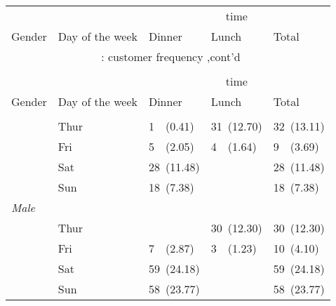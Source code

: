 \documentclass[8pt]{beamer}
\begin{document}
\begin{frame}
\hypertarget{customer frequency}{} 
\begin{longtable}{lllll}
\toprule
&&
\multicolumn{ 3 }{c}{ time } \\
\cmidrule(lr){3-5}
Gender & Day of the week & Dinner & Lunch & Total \\
\hline
\endfirsthead
\multicolumn{5}{c}{\tablename~\thetable{}: customer frequency ,cont'd}\\\\
\toprule
&&
\multicolumn{ 3 }{c}{ time } \\
\cmidrule(lr){3-5}
Gender & Day of the week & Dinner & Lunch & Total \\
\hline
\endhead \hline \endfoot \hline

\endlastfoot
\multicolumn{ 4 }{l}{\textit{ Female }}\\
& Thur & 1~~(0.41) & 31~(12.70) & 32~(13.11) \\
 & Fri & 5~~(2.05) & 4~~(1.64) & 9~~(3.69) \\
 & Sat & 28~(11.48) &  & 28~(11.48) \\
 & Sun & 18~(7.38) &  & 18~(7.38) \\
[2ex]
\multicolumn{ 4 }{l}{\textit{ Male }}\\
& Thur &  & 30~(12.30) & 30~(12.30) \\
 & Fri & 7~~(2.87) & 3~~(1.23) & 10~(4.10) \\
 & Sat & 59~(24.18) &  & 59~(24.18) \\
 & Sun & 58~(23.77) &  & 58~(23.77) \\
[2ex]
\end{longtable}
\end{frame}
\end{document}
